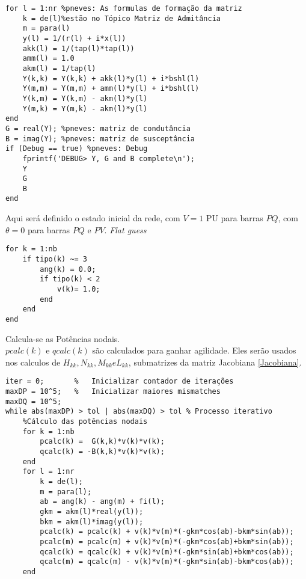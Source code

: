 \begin{verbatim}
for l = 1:nr %pneves: As formulas de formação da matriz
    k = de(l)%estão no Tópico Matriz de Admitância  
    m = para(l)
    y(l) = 1/(r(l) + i*x(l))
    akk(l) = 1/(tap(l)*tap(l))
    amm(l) = 1.0
    akm(l) = 1/tap(l)
    Y(k,k) = Y(k,k) + akk(l)*y(l) + i*bshl(l)
    Y(m,m) = Y(m,m) + amm(l)*y(l) + i*bshl(l)
    Y(k,m) = Y(k,m) - akm(l)*y(l)
    Y(m,k) = Y(m,k) - akm(l)*y(l)
end
G = real(Y); %pneves: matriz de condutância 
B = imag(Y); %pneves: matriz de susceptância
if (Debug == true) %pneves: Debug
    fprintf('DEBUG> Y, G and B complete\n');
    Y
    G
    B
end
\end{verbatim}
Aqui será definido o estado inicial da rede, com $V = 1$ PU para barras $PQ$, com $\theta = 0$ para barras $PQ$ e $PV$. \textit{Flat guess}
\begin{verbatim}
for k = 1:nb
    if tipo(k) ~= 3
        ang(k) = 0.0;
        if tipo(k) < 2
            v(k)= 1.0;
        end
    end
end
\end{verbatim}
Calcula-se as Potências nodais.\\
$pcalc(k)$ e $qcalc(k)$ são calculados para ganhar agilidade. Eles serão usados nos calculos de $H_{kk}, N_{kk}, M_{kk} e L_{kk}$, submatrizes da matriz Jacobiana \ref{Jacobiana}.\\
\begin{verbatim}
iter = 0;       %	Inicializar contador de iterações
maxDP = 10^5;   %	Inicializar maiores mismatches
maxDQ = 10^5;   
while abs(maxDP) > tol | abs(maxDQ) > tol %	Processo iterativo 
    %Cálculo das potências nodais
    for k = 1:nb
        pcalc(k) =  G(k,k)*v(k)*v(k);
        qcalc(k) = -B(k,k)*v(k)*v(k);
    end
    for l = 1:nr
        k = de(l);
        m = para(l);
        ab = ang(k) - ang(m) + fi(l);
        gkm = akm(l)*real(y(l));
        bkm = akm(l)*imag(y(l));
        pcalc(k) = pcalc(k) + v(k)*v(m)*(-gkm*cos(ab)-bkm*sin(ab));
        pcalc(m) = pcalc(m) + v(k)*v(m)*(-gkm*cos(ab)+bkm*sin(ab));
        qcalc(k) = qcalc(k) + v(k)*v(m)*(-gkm*sin(ab)+bkm*cos(ab));
        qcalc(m) = qcalc(m) - v(k)*v(m)*(-gkm*sin(ab)-bkm*cos(ab));
    end
\end{verbatim}

